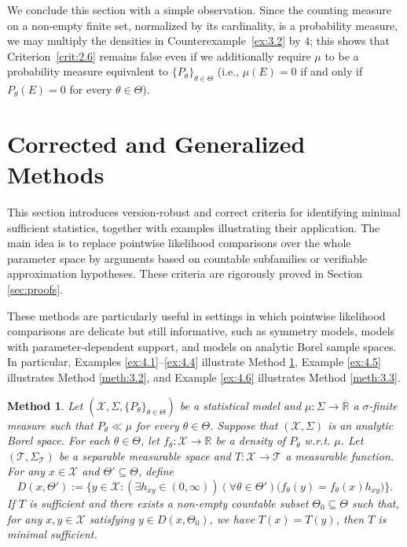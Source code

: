 \documentclass[12pt]{article}
\newtheorem{method}{Method}[section]
\begin{document}
We conclude this section with a simple observation. Since the counting measure on a non-empty finite set, normalized by its cardinality, is a probability measure, we may multiply the densities in Counterexample~\ref{ex:3.2} by $4$; this shows that Criterion~\ref{crit:2.6} remains false even if we additionally require $\mu$ to be a probability measure equivalent to $\{P_\theta\}_{\theta\in\Theta}$ (i.e., $\mu(E)=0$ if and only if $P_\theta(E)=0$ for every $\theta\in\Theta$).

\section{Corrected and Generalized Methods}
\label{sec:methods}

This section introduces version-robust and correct criteria for identifying minimal sufficient statistics, together with examples illustrating their application. The main idea is to replace pointwise likelihood comparisons over the whole parameter space by arguments based on countable subfamilies or verifiable approximation hypotheses. These criteria are rigorously proved in Section \ref{sec:proofs}.

These methods are particularly useful in settings in which pointwise likelihood comparisons are delicate but still informative, such as symmetry models, models with parameter-dependent support, and models on analytic Borel sample spaces. In particular, Examples \ref{ex:4.1}--\ref{ex:4.4} illustrate Method \ref{meth:3.1}, Example \ref{ex:4.5} illustrates Method \ref{meth:3.2}, and Example \ref{ex:4.6} illustrates Method \ref{meth:3.3}.


\begin{method}
\label{meth:3.1}
Let $(\mathcal{X},\Sigma ,\{P_\theta\}_{\theta\in\Theta })$ be a statistical model and $\mu:\Sigma\to\overline{\mathbb{R}}$ a $\sigma$-finite measure such that $P_\theta \ll \mu$ for every $\theta\in\Theta$. Suppose that $(\mathcal{X},\Sigma )$ is an analytic Borel space. For each $\theta\in\Theta$, let $f_\theta :\mathcal{X}\to \mathbb{R}$ be a density of $P_\theta $ w.r.t. $\mu$. Let $(\mathcal{T},\Sigma _\mathcal{T})$ be a separable measurable space and $T:\mathcal{X}\to \mathcal{T}$ a measurable function. For any $x\in \mathcal{X}$ and $\Theta'\subseteq\Theta$, define
$$D(x,\Theta '):=\big\{y\in \mathcal{X}:(\exists h_{xy}\in (0,\infty ))(\forall \theta \in \Theta ')\big(f_\theta (y)=f_\theta (x)h_{xy}\big)\big\}.$$
If $T$ is sufficient and there exists a non-empty countable subset $\Theta _0\subseteq\Theta$ such that, for any $x,y\in\mathcal{X}$ satisfying $y\in D(x,\Theta _0)$, we have $T(x)=T(y)$, then $T$ is minimal sufficient.
\end{method}
\end{document}
